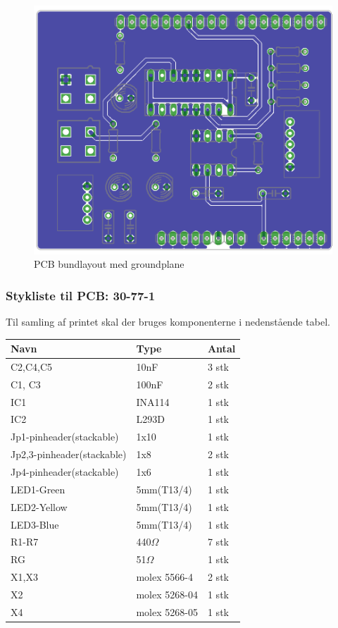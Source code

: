 \begin{figure}[H]
	\centering
	\includegraphics[width=1\textwidth]{billeder/hardware/Bundlayout.png}
	\caption{PCB bundlayout med groundplane}
	\label{fig:PCBbundlayout}
\end{figure}

\newpage
\subsubsection{Stykliste til PCB: 30-77-1}
Til samling af printet skal der bruges komponenterne i nedenstående tabel. 
\begin{center}
		\begin{longtable}{ | m{6cm} | m{4cm}| m{2cm}| } 
			\hline
			\textbf{Navn} &\textbf{Type} & \textbf{Antal} \\ 
			\hline
			C2,C4,C5 & 10nF & 3 stk \\ 
			\hline
			C1, C3 & 100nF & 2 stk \\ 
			\hline
			IC1 & INA114 & 1 stk \\ 
			\hline
			IC2 & L293D & 1 stk \\ 
			\hline
			Jp1-pinheader(stackable) & 1x10 & 1 stk \\ 
			\hline
			Jp2,3-pinheader(stackable) & 1x8 & 2 stk \\ 
			\hline
			Jp4-pinheader(stackable) & 1x6 & 1 stk \\ 
			\hline
			LED1-Green & 5mm(T13/4) & 1 stk \\ 
			\hline	
			LED2-Yellow & 5mm(T13/4) & 1 stk \\ 
			\hline
			LED3-Blue & 5mm(T13/4) & 1 stk \\ 
			\hline
			R1-R7 & 440$\Omega$ & 7 stk \\ 
			\hline
			RG & 51$\Omega$ & 1 stk \\ 
			\hline
			X1,X3 & molex 5566-4 & 2 stk \\ 
			\hline
			X2 & molex 5268-04 & 1 stk \\ 
			\hline
			X4 & molex 5268-05 & 1 stk \\ 
			\hline
		\end{longtable}
\end{center}

